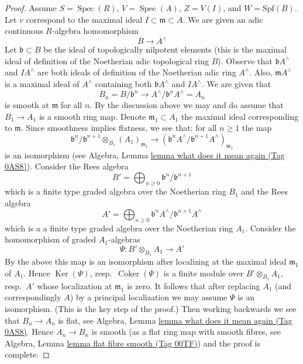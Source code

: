 \documentclass{amsart}
\theoremstyle{plain}
\theoremstyle{definition}
\theoremstyle{remark}
\numberwithin{equation}{subsection}
\def\Spec{\mathop{\mathrm{Spec}}}
\def\Ker{\mathop{\mathrm{Ker}}}
\def\Coker{\mathop{\mathrm{Coker}}}
\begin{document}
\begin{proof}
\medskip\noindent
Assume $S = \Spec(R)$, $V = \Spec(A)$, $Z = V(I)$, and $W = \text{Spf}(B)$.
Let $v$ correspond to the maximal ideal $I \subset \mathfrak m \subset A$.
We are given an adic continuous $R$-algebra homomorphism
$$
B \longrightarrow A^\wedge
$$
Let $\mathfrak b \subset B$ be the ideal of topologically nilpotent
elements (this is the maximal ideal of definition of the Noetherian adic
topological ring $B$). Observe that $\mathfrak b A^\wedge$ and
$IA^\wedge$ are both ideals of definition of the Noetherian adic
ring $A^\wedge$. Also, $\mathfrak m A^\wedge$ is a maximal ideal
of $A^\wedge$ containing both $\mathfrak b A^\wedge$ and $IA^\wedge$.
We are given that
$$
B_n = B/\mathfrak b^n \to A^\wedge/\mathfrak b^n A^\wedge = A_n
$$
is smooth at $\mathfrak m$ for all $n$. By the discussion above
we may and do assume that $B_1 \to A_1$ is a smooth ring map.
Denote $\mathfrak m_1 \subset A_1$ the maximal ideal corresponding
to $\mathfrak m$. Since smoothness implies flatness, we see that:
for all $n \geq 1$ the map
$$
\mathfrak b^n/\mathfrak b^{n + 1} \otimes_{B_1} (A_1)_{\mathfrak m_1}
\longrightarrow
\left(\mathfrak b^nA^\wedge/\mathfrak b^{n + 1}A^\wedge\right)_{\mathfrak m_1}
$$
is an isomorphism (see
Algebra, Lemma \href{https://stacks.math.columbia.edu/tag/0AS8}{lemma what does it mean again (Tag 0AS8)}).
Consider the Rees algebra
$$
B' = \bigoplus\nolimits_{n \geq 0} \mathfrak b^n/\mathfrak b^{n + 1}
$$
which is a finite type graded algebra over the Noetherian ring $B_1$ and
the Rees algebra
$$
A' = \bigoplus\nolimits_{n \geq 0}
\mathfrak b^nA^\wedge/\mathfrak b^{n + 1}A^\wedge
$$
which is a a finite type graded algebra over the Noetherian ring $A_1$.
Consider the homomorphism of graded $A_1$-algebras
$$
\Psi : B' \otimes_{B_1} A_1 \longrightarrow A'
$$
By the above this map is an isomorphism after localizing at
the maximal ideal $\mathfrak m_1$ of $A_1$.
Hence $\Ker(\Psi)$, resp.\ $\Coker(\Psi)$ is a finite module
over $B' \otimes_{B_1} A_1$, resp.\ $A'$ whose localization
at $\mathfrak m_1$ is zero. It follows that after replacing
$A_1$ (and correspondingly $A$) by a principal localization
we may assume $\Psi$ is an isomorphism. (This is the key step of the proof.)
Then working backwards we see that $B_n \to A_n$ is flat, see
Algebra, Lemma \href{https://stacks.math.columbia.edu/tag/0AS8}{lemma what does it mean again (Tag 0AS8)}.
Hence $A_n \to B_n$ is smooth (as a flat ring map with smooth
fibres, see Algebra, Lemma \href{https://stacks.math.columbia.edu/tag/00TF}{lemma flat fibre smooth (Tag 00TF)})
and the proof is complete.
\end{proof}
\end{document}
